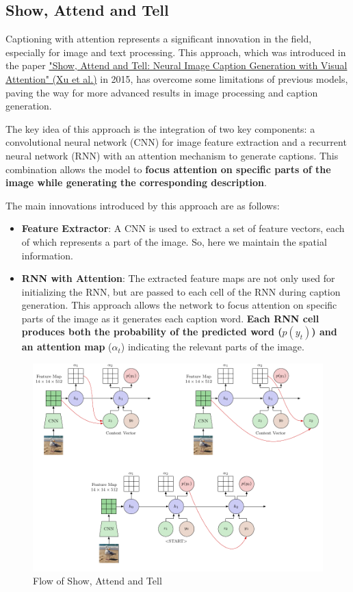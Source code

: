 \subsection{Show, Attend and Tell}

Captioning with attention represents a significant innovation in the field, especially for image and text processing. This approach, which was introduced in the paper \href{https://arxiv.org/pdf/1502.03044}{"Show, Attend and Tell: Neural Image Caption Generation with Visual Attention" (Xu et al.)} in 2015, has overcome some limitations of previous models, paving the way for more advanced results in image processing and caption generation.

The key idea of this approach is the integration of two key components: a convolutional neural network (CNN) for image feature extraction and a recurrent neural network (RNN) with an attention mechanism to generate captions. This combination allows the model to \textbf{focus attention on specific parts of the image while generating the corresponding description}.

The main innovations introduced by this approach are as follows:

\begin{itemize}
    \item \textbf{Feature Extractor}: A CNN is used to extract a set of feature vectors, each of which represents a part of the image. So, here we maintain the spatial information.
    \item \textbf{RNN with Attention}: The extracted feature maps are not only used for initializing the RNN, but are passed to each cell of the RNN during caption generation. This approach allows the network to focus attention on specific parts of the image as it generates each caption word. \textbf{Each RNN cell produces both the probability of the predicted word ($p(y_t)$) and an attention map }($\alpha_t$) indicating the relevant parts of the image.
\end{itemize}

\begin{figure}[!htbp]
    \centering
    \includegraphics[width=\linewidth]{tikz/chapter7 - Show, Attend and Tell.pdf}
    \caption{Flow of Show, Attend and Tell}
\end{figure}

